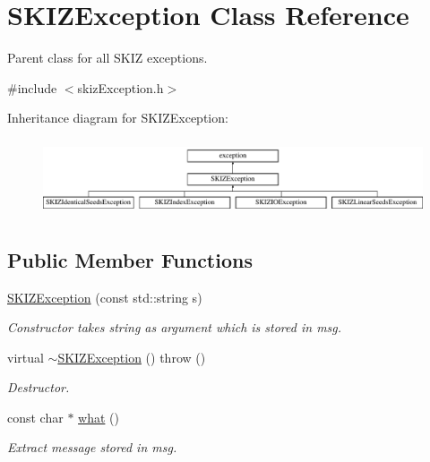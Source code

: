 \hypertarget{classSKIZException}{}\section{S\+K\+I\+Z\+Exception Class Reference}
\label{classSKIZException}


Parent class for all S\+K\+IZ exceptions.  




{\ttfamily \#include $<$skiz\+Exception.\+h$>$}

Inheritance diagram for S\+K\+I\+Z\+Exception\+:\begin{figure}[H]
\begin{center}
\leavevmode
\includegraphics[height=2.270270cm]{classSKIZException}
\end{center}
\end{figure}
\subsection*{Public Member Functions}
\begin{DoxyCompactItemize}
\item 
\mbox{\label{classSKIZException_a30a47c59e9fd4ea93441c9029c4068d9}} 
\mbox{\hyperlink{classSKIZException_a30a47c59e9fd4ea93441c9029c4068d9}{S\+K\+I\+Z\+Exception}} (const std\+::string s)
\begin{DoxyCompactList}\small\item\em Constructor takes string as argument which is stored in msg. \end{DoxyCompactList}\item 
\mbox{\label{classSKIZException_ac1b8f1ba8ae87ce018c645a1a67b6d34}} 
virtual \mbox{\hyperlink{classSKIZException_ac1b8f1ba8ae87ce018c645a1a67b6d34}{$\sim$\+S\+K\+I\+Z\+Exception}} ()  throw ()
\begin{DoxyCompactList}\small\item\em Destructor. \end{DoxyCompactList}\item 
\mbox{\label{classSKIZException_a55c36f650f02f283215679ad070dd54b}} 
const char $\ast$ \mbox{\hyperlink{classSKIZException_a55c36f650f02f283215679ad070dd54b}{what}} ()
\begin{DoxyCompactList}\small\item\em Extract message stored in msg. \end{DoxyCompactList}\end{DoxyCompactItemize}


